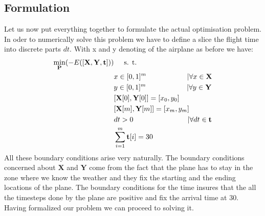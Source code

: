 \subsection{Formulation}

Let us now put everything together to formulate the actual optimisation problem. In oder to numerically solve this problem we have to define a slice the flight time into discrete parts $dt$. With x and y denoting of the airplane as before we have:
\begin{align*}
\min_{\mathbf{P} }( -E(\left[\mathbf{X},\mathbf{Y},\mathbf{t} \right] )) & \hspace{5mm} \text{s. t. } \\
& x \in [0,1]^m \hspace{20mm} | \forall x \in \mathbf{X}\\
& y \in [0,1]^m \hspace{20mm} | \forall y \in \mathbf{Y}\\
& [\mathbf{X}[0],\mathbf{Y}[0]] = [x_0,y_0] \\
& [\mathbf{X}[m],\mathbf{Y}[m]] = [x_m,y_m] \\
& dt > 0 \hspace{26.7mm} | \forall dt \in \mathbf{t}\\
& \sum_{i=1}^m \mathbf{t}[i] = 30 
\end{align*}
All these boundary conditions arise very naturally.
The boundary conditions concerned about $ \mathbf{X} $ and $ \mathbf{Y} $ come from the fact that the plane has to stay in the zone where we know the weather and they fix the starting and the ending locations of the plane.
The boundary conditions for the time insures that the all the timesteps done by the plane are positive and fix the arrival time at 30.
Having formalized our problem we can proceed to solving it.


